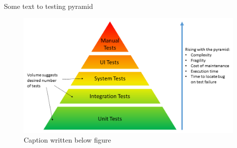 Some text to testing pyramid

\begin{figure}[H]
    \centering
    \includegraphics[width=1\textwidth]{Images/test_pyramid.png}
    \caption[Testing Pyramide]{Caption written below figure \footnotemark}
    \label{fig:flow around cylinder}
\end{figure}
